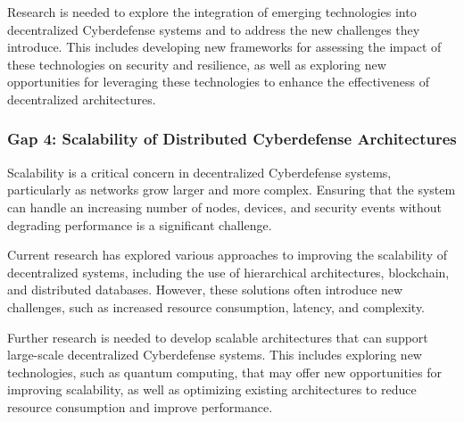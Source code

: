 Research is needed to explore the integration of emerging technologies into decentralized Cyberdefense systems and to address the new challenges they introduce. This includes developing new frameworks for assessing the impact of these technologies on security and resilience, as well as exploring new opportunities for leveraging these technologies to enhance the effectiveness of decentralized architectures.


\subsubsection{Gap 4: Scalability of Distributed Cyberdefense Architectures}

Scalability is a critical concern in decentralized Cyberdefense systems, particularly as networks grow larger and more complex. Ensuring that the system can handle an increasing number of nodes, devices, and security events without degrading performance is a significant challenge.

Current research has explored various approaches to improving the scalability of decentralized systems, including the use of hierarchical architectures, blockchain, and distributed databases. However, these solutions often introduce new challenges, such as increased resource consumption, latency, and complexity.

Further research is needed to develop scalable architectures that can support large-scale decentralized Cyberdefense systems. This includes exploring new technologies, such as quantum computing, that may offer new opportunities for improving scalability, as well as optimizing existing architectures to reduce resource consumption and improve performance.





